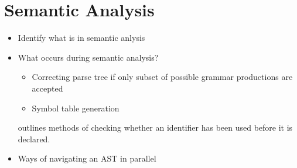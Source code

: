 \begin{comment}
    LLP(q, k) \cite{robin_voetter_parallel_2021}
    \newline \newline
    CYK Parsing \cite{skrzypczak_parallel_nodate}
    \newline \newline
    also mention \cite{mark_thierry_vandevoorde_parallel_1988, alblas_bibliography_1994}
\end{comment}

\section{Semantic Analysis} \label{lit_review_analysis}
\begin{itemize}
    \item Identify what is in semantic anlysis
    \item What occurs during semantic analysis?
    \begin{itemize}
        \item Correcting parse tree if only subset of possible grammar productions are accepted
        \item Symbol table generation
    \end{itemize}

\cite{komathukattil_evaluating_nodate} outlines methods of checking whether an
identifier has been used before it is declared.

\cite{seshadri_investigation_1991}
    \item Ways of navigating an AST in parallel
\end{itemize}





